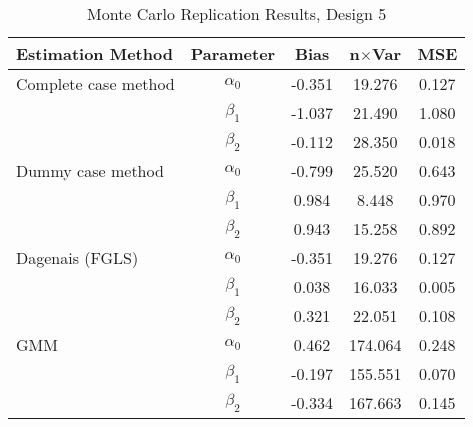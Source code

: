 \begin{table}
\centering
\caption{Monte Carlo Replication Results, Design 5}
\label{table:MCReplicationResultsDesign5}
\begin{tabular}{lcccc}
\toprule
Estimation Method & Parameter & Bias & n$\times$Var & MSE \\
\midrule
Complete case method & $\alpha_0$ & -0.351 & 19.276 & 0.127 \\
 & $\beta_1$ & -1.037 & 21.490 & 1.080 \\
 & $\beta_2$ & -0.112 & 28.350 & 0.018 \\
Dummy case method & $\alpha_0$ & -0.799 & 25.520 & 0.643 \\
 & $\beta_1$ & 0.984 & 8.448 & 0.970 \\
 & $\beta_2$ & 0.943 & 15.258 & 0.892 \\
Dagenais (FGLS) & $\alpha_0$ & -0.351 & 19.276 & 0.127 \\
 & $\beta_1$ & 0.038 & 16.033 & 0.005 \\
 & $\beta_2$ & 0.321 & 22.051 & 0.108 \\
GMM & $\alpha_0$ & 0.462 & 174.064 & 0.248 \\
 & $\beta_1$ & -0.197 & 155.551 & 0.070 \\
 & $\beta_2$ & -0.334 & 167.663 & 0.145 \\
\bottomrule
\end{tabular}
\end{table}
